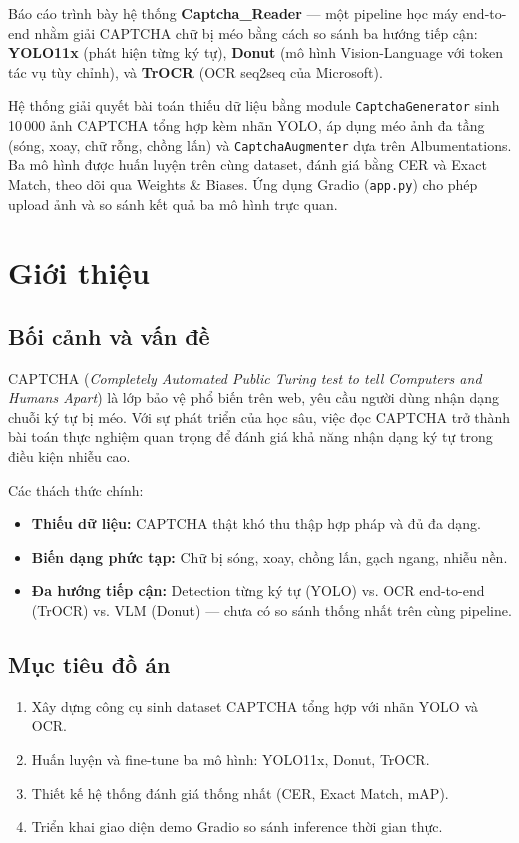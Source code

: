 \documentclass[a4paper,12pt]{report}
\begin{document}
Báo cáo trình bày hệ thống \textbf{Captcha\_Reader} --- một pipeline học máy end-to-end nhằm giải CAPTCHA chữ bị méo bằng cách so sánh ba hướng tiếp cận: \textbf{YOLO11x} (phát hiện từng ký tự), \textbf{Donut} (mô hình Vision-Language với token tác vụ tùy chỉnh), và \textbf{TrOCR} (OCR seq2seq của Microsoft).

Hệ thống giải quyết bài toán thiếu dữ liệu bằng module \texttt{CaptchaGenerator} sinh 10\,000 ảnh CAPTCHA tổng hợp kèm nhãn YOLO, áp dụng méo ảnh đa tầng (sóng, xoay, chữ rỗng, chồng lấn) và \texttt{CaptchaAugmenter} dựa trên Albumentations. Ba mô hình được huấn luyện trên cùng dataset, đánh giá bằng CER và Exact Match, theo dõi qua Weights \& Biases. Ứng dụng Gradio (\texttt{app.py}) cho phép upload ảnh và so sánh kết quả ba mô hình trực quan.

\tableofcontents
\listoftables

\chapter{Giới thiệu}

\section{Bối cảnh và vấn đề}
CAPTCHA (\textit{Completely Automated Public Turing test to tell Computers and Humans Apart}) là lớp bảo vệ phổ biến trên web, yêu cầu người dùng nhận dạng chuỗi ký tự bị méo. Với sự phát triển của học sâu, việc đọc CAPTCHA trở thành bài toán thực nghiệm quan trọng để đánh giá khả năng nhận dạng ký tự trong điều kiện nhiễu cao.

Các thách thức chính:
\begin{itemize}[leftmargin=*]
  \item \textbf{Thiếu dữ liệu:} CAPTCHA thật khó thu thập hợp pháp và đủ đa dạng.
  \item \textbf{Biến dạng phức tạp:} Chữ bị sóng, xoay, chồng lấn, gạch ngang, nhiễu nền.
  \item \textbf{Đa hướng tiếp cận:} Detection từng ký tự (YOLO) vs. OCR end-to-end (TrOCR) vs. VLM (Donut) --- chưa có so sánh thống nhất trên cùng pipeline.
\end{itemize}

\section{Mục tiêu đồ án}
\begin{enumerate}[leftmargin=*]
  \item Xây dựng công cụ sinh dataset CAPTCHA tổng hợp với nhãn YOLO và OCR.
  \item Huấn luyện và fine-tune ba mô hình: YOLO11x, Donut, TrOCR.
  \item Thiết kế hệ thống đánh giá thống nhất (CER, Exact Match, mAP).
  \item Triển khai giao diện demo Gradio so sánh inference thời gian thực.
\end{enumerate}
\end{document}
